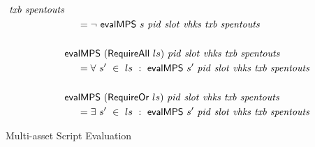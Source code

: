 \begin{figure*}[htb]
\begin{align*}
    ~\mathit{txb}~\mathit{spentouts}
   \\
    &~~~~ = \neg ~\mathsf{evalMPS}~s~\mathit{pid}~\mathit{slot}~\mathit{vhks}
    ~\mathit{txb}~\mathit{spentouts}\\~\\
    &\mathsf{evalMPS}~(\mathsf{RequireAll}~ls)~\mathit{pid}~\mathit{slot}~\mathit{vhks}
    ~\mathit{txb}~\mathit{spentouts}
   \\
    &~~~~ = \forall ~s'~ \in~ ls~:~\mathsf{evalMPS}~s'~\mathit{pid}~\mathit{slot}~\mathit{vhks}
    ~\mathit{txb}~\mathit{spentouts}\\~\\
    &\mathsf{evalMPS}~(\mathsf{RequireOr}~ls)~\mathit{pid}~\mathit{slot}~\mathit{vhks}
    ~\mathit{txb}~\mathit{spentouts}
   \\
    &~~~~ = \exists ~s'~ \in~ ls~:~\mathsf{evalMPS}~s'~\mathit{pid}~\mathit{slot}~\mathit{vhks}
    ~\mathit{txb}~\mathit{spentouts}\\
  \end{align*}
  \caption{Multi-asset Script Evaluation}
  \label{fig:defs:tx-mc-eval}
\end{figure*}

